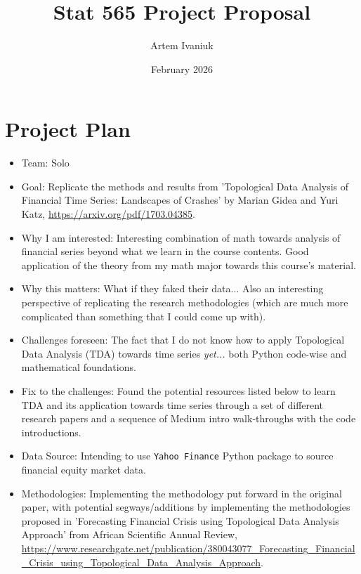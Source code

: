 \documentclass{article}
\title{Stat 565 Project Proposal}
\author{Artem Ivaniuk}
\date{February 2026}
\begin{document}
        
        \maketitle
        
        \section*{Project Plan}
        \begin{itemize}
        \item Team: Solo
        \item Goal: Replicate the methods and results from 'Topological Data Analysis of Financial Time Series: Landscapes of Crashes' by Marian Gidea and Yuri Katz, \url{https://arxiv.org/pdf/1703.04385}. 
        \item Why I am interested: Interesting combination of math towards analysis of financial series beyond what we learn in the course contents. Good application of the theory from my math major towards this course's material. 
        \item Why this matters: What if they faked their data... Also an interesting perspective of replicating the research methodologies (which are much more complicated than something that I could come up with). 
        \item Challenges foreseen: The fact that I do not know how to apply Topological Data Analysis (TDA) towards time series \textit{yet...} both Python code-wise and mathematical foundations.
        \item Fix to the challenges: Found the potential resources listed below to learn TDA and its application towards time series through a set of different research papers and a sequence of Medium intro walk-throughs with the code introductions.
        \item Data Source: Intending to use \texttt{Yahoo Finance} Python package to source financial equity market data. 
        \item Methodologies: Implementing the methodology put forward in the original paper, with potential segways/additions by implementing the methodologies proposed in 'Forecasting Financial Crisis using Topological Data Analysis Approach' from African Scientific Annual Review, \url{https://www.researchgate.net/publication/380043077_Forecasting_Financial_Crisis_using_Topological_Data_Analysis_Approach}. 
        \end{itemize}
        
\end{document}
